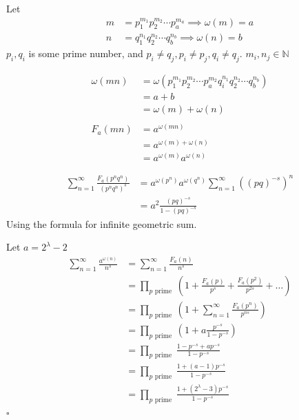 \documentclass{article}
\begin{document}
\pagebreak
\begin{solution}
Let 
\begin{align*}
m&=p_1^{m_1}p_2^{m_2}  \cdots p_a^{m_a} \implies \omega(m)=a\\
n&=q_1^{n_1}q_2^{n_2} \cdots  q_b^{n_b} \implies \omega(n)=b
\end{align*}
$p_i, q_i$ is some prime number, and $p_i \neq q_j, p_i \neq p_j, q_i \neq q_j$. $m_i,n_j\in\mathbb N$ 

\begin{align*}
\omega(m n)&=\omega\left(p_1^{m_1}p_2^{m_2} \cdots p_a^{m_2}q_i^{n_1}  q_2^{n_2} \cdots  q_b^{n_b}\right)\\
&=a+b\\
&=\omega(m)+\omega(n) \\
& \\
 F_a(m n) & =a^{\omega(m n)} \\
& =a^{\omega(m) + \omega(n)} \\
& =a^{\omega(m)} a^{\omega(n)}
\end{align*}

\end{solution}

\begin{solution}
\begin{align*}
    \sum_{n=1}^{\infty} \frac{F_a\left(p^n q^n\right)}{\left(p^n q^n\right)^s}&=a^{\omega\left(p^n\right)}a^{\omega\left(q^n\right)}\sum_{n=1}^{\infty} \left((p q)^{-s}\right)^{n}\\
    &=a^2 \frac{(p q)^{-s}}{1-(p q)^{-s}}
\end{align*}
Using the formula for infinite geometric sum.
\end{solution}

\begin{solution}
Let $a=2^\lambda-2$
$$
\begin{aligned}
\sum_{n=1}^{\infty} \frac{a^{\omega(n)}}{n^s} & =\sum_{n=1}^{\infty} \frac{F_a(n)}{n^s} \\
& =\prod_{p \text { prime }}\left(1+\frac{F_a(p)}{p^s}+\frac{F_a\left(p^2\right)}{p^{2 s}}+\ldots\right) \\
& =\prod_{p \text { prime }}\left(1+\sum_{n=1}^{\infty} \frac{F_a\left(p^n\right)}{p^{n s}}\right) \\
& =\prod_{p \text { prime }}\left(1+a \frac{p^{-s}}{1-p^{-s}}\right) \\
& =\prod_{p \text { prime }} \frac{1-p^{-s}+a p^{-s}}{1-p^{-s}} \\
& =\prod_{p \text { prime }} \frac{1+(a-1) p^{-s}}{1-p^{-s}} \\
& =\prod_{p \text { prime }} \frac{1+\left(2^\lambda-3\right) p^{-s}}{1-p^{-s}}
\end{aligned}
$$$
\square$
\end{solution}
\end{document}
